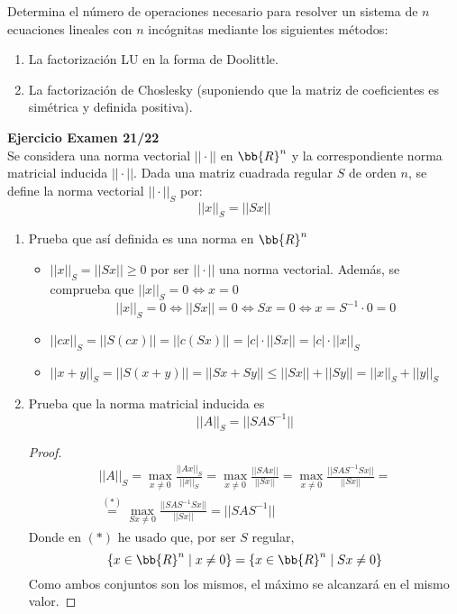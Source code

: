 \begin{ejercicio}
    Determina el número de operaciones necesario para resolver un sistema de $n$ ecuaciones lineales con $n$ incógnitas mediante los siguientes métodos:
    \begin{enumerate}
        \item La factorización LU en la forma de Doolittle.
        \item La factorización de Choslesky (suponiendo que la matriz de coeficientes es simétrica y definida positiva).
    \end{enumerate}
\end{ejercicio}


\begin{ejercicio} \textbf{Ejercicio Examen 21/22}\\
     Se considera una norma vectorial $||\cdot||$ en $\bb{R}^n$ y la correspondiente norma matricial inducida $||\cdot||$. Dada una matriz cuadrada regular $S$ de orden $n$, se define la norma vectorial $||\cdot||_S$ por:
     $$||x||_S = ||Sx||$$

     \begin{enumerate}
         \item Prueba que así definida es una norma en $\bb{R}^n$
         \begin{itemize}
             \item $||x||_S = ||Sx|| \geq 0$ por ser $||\cdot||$ una norma vectorial. Además, se comprueba que $||x||_S = 0 \Longleftrightarrow x=0$
             $$||x||_S = 0 \Longleftrightarrow ||Sx|| = 0 \Longleftrightarrow Sx = 0 \Longleftrightarrow x = S^{-1}\cdot 0 = 0$$

             \item $||cx||_S = ||S(cx)|| = ||c(Sx)|| = |c|\cdot ||Sx|| = |c| \cdot ||x||_S$

             \item $||x+y||_S = ||S(x+y)|| = ||Sx + Sy|| \leq ||Sx|| + ||Sy|| = ||x||_S + ||y||_S$
         \end{itemize}

         \item Prueba que la norma matricial inducida es
         $$||A||_S = ||SAS^{-1}||$$
         \begin{proof}
             \begin{multline*}
                 ||A||_S = \max_{x\neq 0} \frac{||Ax||_S}{||x||_S}
                 = \max_{x\neq 0} \frac{||SAx||}{||Sx||}
                 = \max_{x\neq 0} \frac{||SAS^{-1}Sx||}{||Sx||}
                 =\\ \stackrel{(\ast)}{=}
                 \max_{Sx\neq 0} \frac{||SAS^{-1}Sx||}{||Sx||} = ||SAS^{-1}||
             \end{multline*}
             Donde en $(\ast)$ he usado que, por ser $S$ regular,
             $$\{x\in \bb{R}^n \mid x\neq 0\} = \{x\in \bb{R}^n \mid Sx\neq 0\}$$
             Como ambos conjuntos son los mismos, el máximo se alcanzará en el mismo valor.
        \end{proof}


\end{enumerate}
\end{ejercicio}
